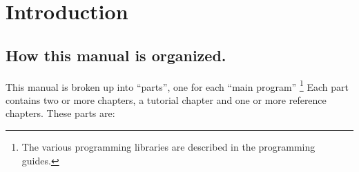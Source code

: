 
\chapter{Introduction}
\label{chpt:Introduction}

\section{How this manual is organized.}

This manual is broken up into ``parts'', one for each ``main program''%
\footnote{The various programming libraries are described in the programming
guides\cite{progguide}.} Each part contains two or more chapters, a
tutorial chapter and one or more reference chapters.  These parts are:

